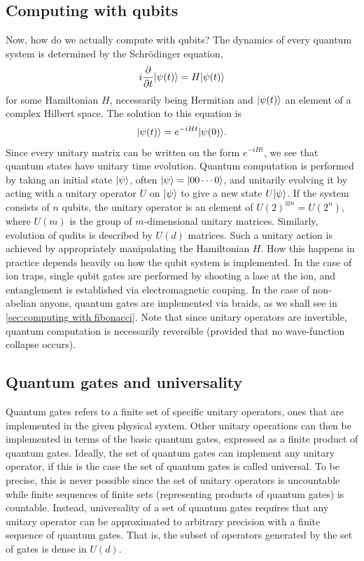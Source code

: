 \documentclass[a4paper,10pt,oneside]{book}
\theoremstyle{plain}
\theoremstyle{definition}
\theoremstyle{remark}
\DeclarePairedDelimiter\ket{\lvert}{\rangle}
\begin{document}
\subsection{Computing with qubits}

Now, how do we actually compute with qubits? The dynamics of every quantum system is determined by the Schrödinger equation,
\begin{equation}
  i\frac{\partial}{\partial t}\ket{\psi(t)} = H\ket{\psi(t)}
\end{equation}
for some Hamiltonian $H$, necessarily being Hermitian and $\ket{\psi(t)}$ an element of a complex Hilbert space. The solution to this equation is
\begin{equation}
  \ket{\psi(t)} = e^{-iHt}\ket{\psi(0)}.
\end{equation}
Since every unitary matrix can be written on the form $e^{-iHt}$, we see that quantum states have unitary time evolution. Quantum computation is performed by taking an initial state $\ket{\psi}$, often $\ket{\psi} = \ket{00\cdots0}$, and unitarily evolving it by acting with a unitary operator $U$ on $\ket{\psi}$ to give a new state $U\ket{\psi}$. If the system consists of $n$ qubits, the unitary operator is an element of $U(2)^{\otimes n} = U(2^n)$, where $U(m)$ is the group of $m$-dimensional unitary matrices. Similarly, evolution of qudits is described by $U(d)$ matrices. Such a unitary action is achieved by appropriately manipulating the Hamiltonian $H$. How this happens in practice depends heavily on how the qubit system is implemented. In the case of ion traps, single qubit gates are performed by shooting a lase at the ion, and entanglement is established via electromagnetic couping. In the case of non-abelian anyons, quantum gates are implemented via braids, as we shall see in \cref{sec:computing with fibonacci}. Note that since unitary operators are invertible, quantum computation is necessarily reversible (provided that no wave-function collapse occurs).



\subsection{Quantum gates and universality}\label{sec:gates and universality}

Quantum gates refers to a finite set of specific unitary operators, ones that are implemented in the given physical system. Other unitary operations can then be implemented in terms of the basic quantum gates, expressed as a finite product of quantum gates. Ideally, the set of quantum gates can implement any unitary operator, if this is the case the set of quantum gates is called universal. To be precise, this is never possible since the set of unitary operators is uncountable while finite sequences of finite sets (representing products of quantum gates) is countable. Instead, universality of a set of quantum gates requires that any unitary operator can be approximated to arbitrary precision with a finite sequence of quantum gates. That is, the subset of operators generated by the set of gates is dense in $U(d)$.
\end{document}
